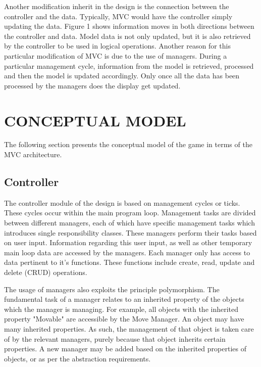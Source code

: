\documentclass[10pt,twocolumn]{witseiepaper}
\begin{document}
Another modification inherit in the design is the connection between the controller and the data. Typically, MVC would have the controller simply updating the data. Figure 1 shows information moves in both directions between the controller and data. Model data is not only updated, but it is also retrieved by the controller to be used in logical operations. Another reason for this particular modification of MVC is due to the use of managers. During a particular management cycle, information from the model is retrieved, processed and then the model is updated accordingly. Only once all the data has been processed by the managers does the display get updated.  



%
\section{CONCEPTUAL MODEL} %

The following section presents the conceptual model of the game in terms of the MVC architecture.

\subsection{Controller}
The controller module of the design is based on management cycles or ticks. These cycles occur within the main program loop. Management tasks are divided between different managers, each of which have specific management tasks which introduces single responsibility classes. These managers perform their tasks based on user input. Information regarding this user input, as well as other temporary main loop data are accessed by the managers. Each manager only has access to data pertinent to it's functions. These functions include create, read, update and delete (CRUD) operations.

The usage of managers also exploits the principle polymorphism. The fundamental task of a manager relates to an inherited property of the objects which the manager is managing. For example, all objects with the inherited property "Movable" are accessible by the Move Manager. An object may have many inherited properties. As such, the management of that object is taken care of by the relevant managers, purely because that object inherits certain properties. A new manager may be added based on the inherited properties of objects, or as per the abstraction requirements.
\end{document}
